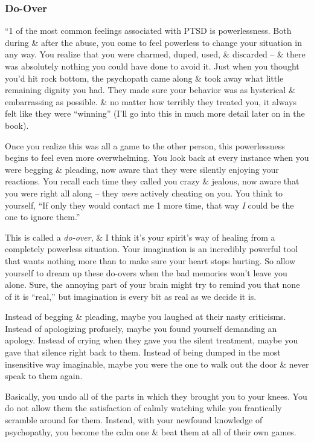 \documentclass{article}
\numberwithin{equation}{section}
\begin{document}
\subsubsection{Do-Over}
``1 of the most common feelings associated with PTSD is powerlessness. Both during \& after the abuse, you come to feel powerless to change your situation in any way. You realize that you were charmed, duped, used, \& discarded -- \& there was absolutely nothing you could have done to avoid it. Just when you thought you'd hit rock bottom, the psychopath came along \& took away what little remaining dignity you had. They made sure your behavior was as hysterical \& embarrassing as possible. \& no matter how terribly they treated you, it always felt like they were ``winning'' (I'll go into this in much more detail later on in the book).

Once you realize this was all a game to the other person, this powerlessness begins to feel even more overwhelming. You look back at every instance when you were begging \& pleading, now aware that they were silently enjoying your reactions. You recall each time they called you crazy \& jealous, now aware that you were right all along -- they \textit{were} actively cheating on you. You think to yourself, ``If only they would contact me 1 more time, that way \textit{I} could be the one to ignore them.''

This is called a \textit{do-over}, \& I think it's your spirit's way of healing from a completely powerless situation. Your imagination is an incredibly powerful tool that wants nothing more than to make sure your heart stops hurting. So allow yourself to dream up these do-overs when the bad memories won't leave you alone. Sure, the annoying part of your brain might try to remind you that none of it is ``real,'' but imagination is every bit as real as we decide it is.

Instead of begging \& pleading, maybe you laughed at their nasty criticisms. Instead of apologizing profusely, maybe you found yourself demanding an apology. Instead of crying when they gave you the silent treatment, maybe you gave that silence right back to them. Instead of being dumped in the most insensitive way imaginable, maybe you were the one to walk out the door \& never speak to them again.

Basically, you undo all of the parts in which they brought you to your knees. You do not allow them the satisfaction of calmly watching while you frantically scramble around for them. Instead, with your newfound knowledge of psychopathy, you become the calm one \& beat them at all of their own games.
\end{document}
